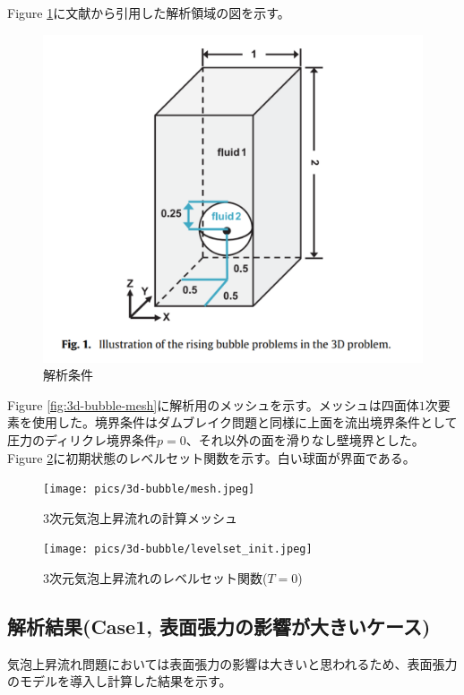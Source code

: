 Figure \ref{fig:3d-bubble-setting}に文献\cite{Safi2017}から引用した解析領域の図を示す。

\begin{figure}[H]
	\centering
	\includegraphics[width=10truecm]{pics/3d-bubble/setting.pdf}
	\caption{解析条件\cite{Safi2017}}
	\label{fig:3d-bubble-setting}
\end{figure}

Figure \ref{fig:3d-bubble-mesh}に解析用のメッシュを示す。メッシュは四面体$1$次要素を使用した。境界条件はダムブレイク問題と同様に上面を流出境界条件として圧力のディリクレ境界条件$p=0$、それ以外の面を滑りなし壁境界とした。
Figure \ref{fig:3d-bubble-levelset_t0_3d}に初期状態のレベルセット関数を示す。白い球面が界面である。

\begin{figure}[H]
	\centering
	\begin{minipage}[b]{0.49\columnwidth}
	    \centering
	    \texttt{[image: pics/3d-bubble/mesh.jpeg]}
		\caption{3次元気泡上昇流れの計算メッシュ}
		\label{fig:3d-bubble-mesh}
	\end{minipage}
	\begin{minipage}[b]{0.49\columnwidth}
	    \centering
	    \texttt{[image: pics/3d-bubble/levelset\_init.jpeg]}
		\caption{3次元気泡上昇流れのレベルセット関数($T=0$)}
		\label{fig:3d-bubble-levelset_t0_3d}
	\end{minipage}
\end{figure}

\newpage
\subsection{解析結果(Case1, 表面張力の影響が大きいケース)}
気泡上昇流れ問題においては表面張力の影響は大きいと思われるため、表面張力のモデルを導入し計算した結果を示す。

